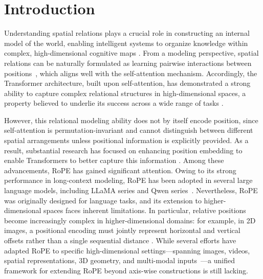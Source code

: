 \documentclass{article}
\theoremstyle{plain}
\theoremstyle{definition}
\theoremstyle{remark}
\begin{document}
\section{Introduction}
Understanding spatial relations plays a crucial role in constructing an internal model of the world, enabling intelligent systems to organize knowledge within complex, high-dimensional cognitive maps \cite{tolman_cognitive_1948,gornet2024automated}. From a modeling perspective, spatial relations can be naturally formulated as learning pairwise interactions between positions~\cite{gao2019learning}, which aligns well with the self-attention mechanism. Accordingly, the Transformer architecture, built upon self-attention, has demonstrated a strong ability to capture complex relational structures in high-dimensional spaces, a property believed to underlie its success across a wide range of tasks \cite{reinauer2022persformertransformerarchitecturetopological}.

However, this relational modeling ability does not by itself encode position, since self-attention is permutation-invariant and cannot distinguish between different spatial arrangements unless positional information is explicitly provided. As a result, substantial research has focused on enhancing position embedding to enable Transformers to better capture this information \cite{li2021learnable,raffel2020exploring, press2021train}. Among these advancements, RoPE \cite{su2024roformer} has gained significant attention. Owing to its strong performance in long-context modeling, RoPE has been adopted in several large language models, including LLaMA series \cite{touvron2023llamaopenefficientfoundation,grattafiori2024llama} and Qwen series~\cite{wang2024qwen2,yang2025qwen3}. Nevertheless, RoPE was originally designed for language tasks, and its extension to higher-dimensional spaces faces inherent limitations. In particular, relative positions become increasingly complex in higher-dimensional domains: for example, in 2D images, a positional encoding must jointly represent horizontal and vertical offsets rather than a single sequential distance \cite{shaw2018self}. While several efforts have adapted RoPE to specific high-dimensional settings—spanning images, videos, spatial representations, 3D geometry, and multi-modal inputs~\cite{heo2024rotary,wei2025videorope,mai2020multi,ji2025ropetr,lu2024unified}—a unified framework for extending RoPE beyond axis-wise constructions is still lacking.
\end{document}
